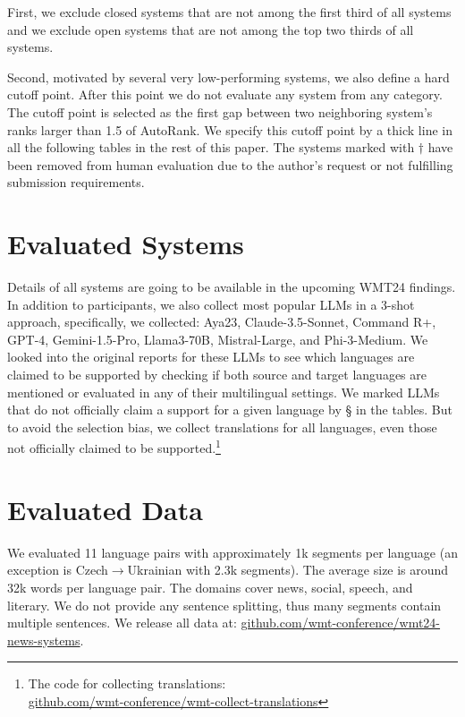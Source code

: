 \documentclass[11pt]{article}
\newcommand{\nonsupporting}[1]{#1 \S}
\begin{document}
First,
we exclude closed systems that are not among the first third of all systems
and we exclude open systems that are not among the top two thirds of all systems.

Second, motivated by several very low-performing systems, we also define a hard cutoff point.
After this point we do not evaluate any system from any category.
The cutoff point is selected as the first gap between two neighboring system's ranks larger than 1.5 of AutoRank.
We specify this cutoff point by a thick line in all the following tables in the rest of this paper.
The systems marked with $\dagger$ have been removed from human evaluation due to the author's request or not fulfilling submission requirements.

\section*{Evaluated Systems}

Details of all systems are going to be available in the upcoming WMT24 findings.
In addition to participants, we also collect most popular LLMs in a 3-shot approach, specifically, we collected: Aya23, Claude-3.5-Sonnet, Command R+, GPT-4, Gemini-1.5-Pro, Llama3-70B, Mistral-Large, and Phi-3-Medium.
We looked into the original reports for these LLMs to see which languages are claimed to be supported by checking if both source and target languages are mentioned or evaluated in any of their multilingual settings. 
We marked LLMs that do not officially claim a support for a given language by \nonsupporting{} in the tables. But to avoid the selection bias, we collect translations for all languages, even those not officially claimed to be supported.\footnote{The code for collecting translations: \\ \null\hfill \href{https://github.com/wmt-conference/wmt-collect-translations}{github.com/wmt-conference/wmt-collect-translations}}

\section*{Evaluated Data}

We evaluated 11 language pairs with approximately 1k segments per language (an exception is Czech$\rightarrow$Ukrainian with 2.3k segments). The average size is around 32k words per language pair.
The domains cover news, social, speech, and literary.
We do not provide any sentence splitting, thus many segments contain multiple sentences. 
We release all data at: \href{https://github.com/wmt-conference/wmt24-news-systems}{github.com/wmt-conference/wmt24-news-systems}.
\end{document}
